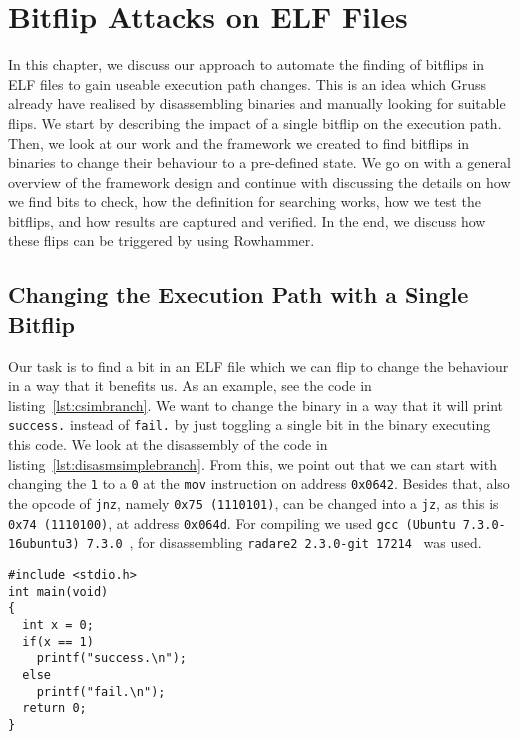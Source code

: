 \chapter{Bitflip Attacks on ELF Files}\label{sec:elfattack}

In this chapter, we discuss our approach to automate the finding of bitflips in
ELF files to gain useable execution path changes. This is an idea which
Gruss~\etal~\cite{flipinthewall} already have realised by disassembling binaries
and manually looking for suitable flips. We start by describing the impact of a
single bitflip on the execution path. Then, we look at our work and the
framework we created to find bitflips in binaries to change their behaviour to a
pre-defined state. We go on with a general overview of the framework design and
continue with discussing the details on how we find bits to check, how the
definition for searching works, how we test the bitflips, and how results are
captured and verified. In the end, we discuss how these flips can be triggered
by using Rowhammer.

\section{Changing the Execution Path with a Single Bitflip}

Our task is to find a bit in an ELF file which we can flip to change the
behaviour in a way that it benefits us. As an example, see the code in
listing~\ref{lst:csimbranch}. We want to change the binary in a
way that it will print \texttt{success.} instead of \texttt{fail.} by just
toggling a single bit in the binary executing this code. We look at the
disassembly of the code in listing~\ref{lst:disasmsimplebranch}. From this, we
point out that we can start with changing the \texttt{1} to a \texttt{0} at
the \texttt{mov} instruction on address \texttt{0x0642}. Besides that, also the
opcode of \texttt{jnz}, namely \texttt{0x75 (1110101)}, can be changed into a
\texttt{jz}, as this is \texttt{0x74 (1110100)}, at address \texttt{0x064d}. For
compiling we used \texttt{gcc (Ubuntu 7.3.0-16ubuntu3) 7.3.0}~\cite{gccubuntu},
for disassembling \texttt{radare2 2.3.0-git 17214}~\cite{radare2web} was used.

\begin{minipage}{\linewidth}
\begin{lstlisting}[style=CStyle,
                   caption={Simple branching code to show an example for a
single bitflip to change the execution path.},
                   label={lst:csimbranch}]
#include <stdio.h>
int main(void)
{
  int x = 0;
  if(x == 1)
    printf("success.\n");
  else
    printf("fail.\n");
  return 0;
}
\end{lstlisting}
\end{minipage}

